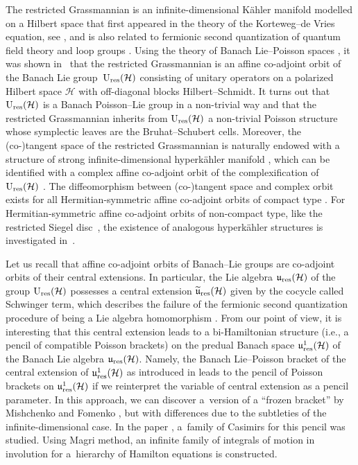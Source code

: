 \documentclass[pdftex]{sigma}
\theoremstyle{definition}
\numberwithin{equation}{section}
\renewcommand{\H}{\mathcal{H}}
\newcommand{\Ur}{\mathrm{U}_{\textnormal{res}}(\H)}
\newcommand{\ur}{\mathfrak u_{\textnormal{res}}(\H)}
\newcommand{\urp}{\mathfrak u_{\textnormal{res}}^1(\H)}
\newcommand{\urt}{\widetilde{\mathfrak u}_{\textnormal{res}}(\H)}
\begin{document}
The restricted Grassmannian is an infinite-dimensional K\"ahler manifold modelled on a Hilbert space that first appeared in the theory of the Korteweg--de Vries equation, see \cite{sato-sato,segal-wilson}, and is also related to fermionic second quantization of quantum field theory \cite{chiumiento24,mickelsson,wurzbacher} and loop groups \cite{segal, segal-wilson}. Using the theory of Banach Lie--Poisson spaces \cite{OR, Oext}, it was shown in~\cite{Ratiu-grass} that the restricted Grassmannian is an affine co-adjoint orbit of the Banach Lie group~$\Ur$ consisting of unitary operators on a polarized Hilbert space $\mathcal{H}$ with off-diagonal blocks Hilbert--Schmidt. It turns out that $\Ur$ is a Banach Poisson--Lie group in a non-trivial way \cite{tumpach-bruhat} and that the restricted Grassmannian inherits from $\Ur$ a non-trivial Poisson structure whose symplectic leaves are the Bruhat--Schubert cells.
Moreover, the (co-)tangent space of the restricted Grassmannian is naturally endowed with a structure of strong infinite-dimensional hyperk\"ahler manifold \cite{tumpach-hyperkahler}, which can be identified with a complex affine co-adjoint orbit of the complexification of $\Ur$ \cite{tumpach-hyperkaehler2}. The diffeomorphism between (co-)tangent space and complex orbit exists for all Hermitian-symmetric affine co-adjoint orbits of compact type \cite{tumpach-hyperkaehler2,tumpach-classification}. For Hermitian-symmetric affine co-adjoint orbits of non-compact type, like the restricted Siegel disc~\cite{T-siegel}, the existence of analogous hyperk\"ahler structures is investigated in~\cite{GBRT-hyperkaehler}.

Let us recall that affine co-adjoint orbits of Banach--Lie groups are co-adjoint orbits of their central extensions. In particular, the Lie algebra $\ur$ of the group $\Ur$ possesses a central extension $\urt$ given by the cocycle called Schwinger term, which describes the failure of the fermionic second quantization procedure of being a Lie algebra homomorphism \cite{mickelsson,schwinger,wurzbacher}. From our point of view, it is interesting that this central extension leads to a bi-Hamiltonian structure (i.e., a pencil of compatible Poisson brackets) on the predual Banach space $\urp$ of the Banach Lie algebra $\ur$. Namely, the Banach Lie--Poisson bracket of the central extension of $\urp$ as introduced in \cite{Ratiu-grass} leads to the pencil of Poisson brackets on $\urp$ if we reinterpret the variable of central extension as a pencil parameter. In this approach, we can discover a~version of a ``frozen bracket'' by Mishchenko and Fomenko \cite{fomenko-trofimov}, but with differences due to the subtleties of the infinite-dimensional case. In the paper \cite{GO-grass}, a~family of Casimirs for this pencil was studied. Using Magri method, an infinite family of integrals of motion in involution for a~hierarchy of Hamilton equations is constructed.
\end{document}
